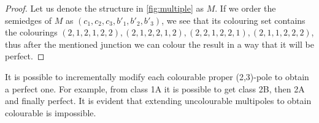\begin{proof} 
	Let us denote the structure in  \cref{fig:multiple} as $M$. If we order the semiedges of $M$ as $(c_1,c_2,c_3,b'_1,b'_2,b'_3)$, we see that its colouring set contains the colourings $(2,1,2,1,2,2), (2,1,2,2,1,2), (2,2,1,2,2,1), (2,1,1,2,2,2)$, thus after the mentioned junction we can colour the result in a way that it will be perfect.
\end{proof}

It is possible to incrementally modify each colourable proper (2,3)-pole to obtain a perfect one. For example, from class 1A it is possible to get class 2B, then 2A and finally perfect. It is evident that extending uncolourable multipoles to obtain colourable is impossible.